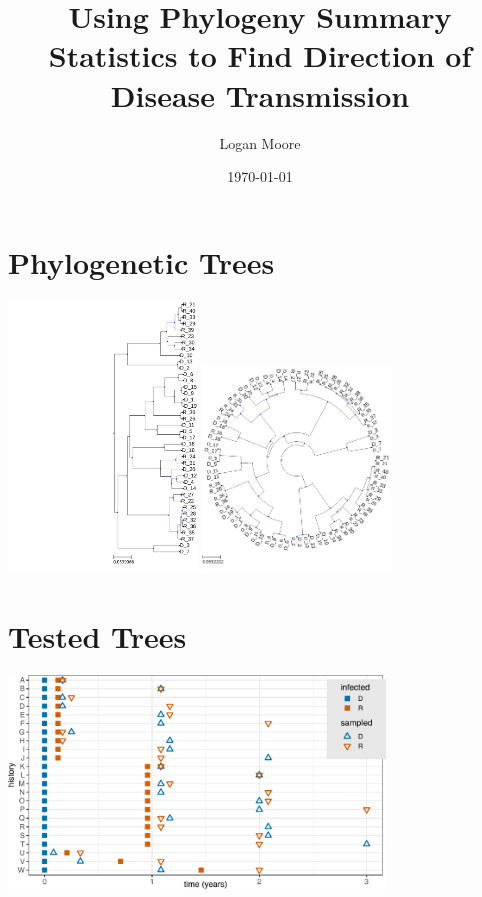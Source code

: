 \documentclass[
10pt,aspectratio=169,notheorems,hyperref={pdfauthor=whatever}
]{beamer}
\title[
]{Using Phylogeny Summary Statistics to Find Direction of Disease Transmission}
\author[
]{
    Logan Moore 
}
\institute{
    Institute for Computing in Research}
\date{\today}
\begin{document}
{
\begin{frame}
  \titlepage
\end{frame}
}
\addtocounter{framenumber}{-1}

\section{Phylogenetic Trees}
\begin{frame}
  \centering
  \includegraphics[width=5cm, angle=90]{phylotree}
  \includegraphics[width=5cm]{circle_phylo}
\end{frame}

\section{Tested Trees}
\begin{frame}
  \centering
  \includegraphics[width=10cm]{histories}
 \end{frame}
\end{document}
